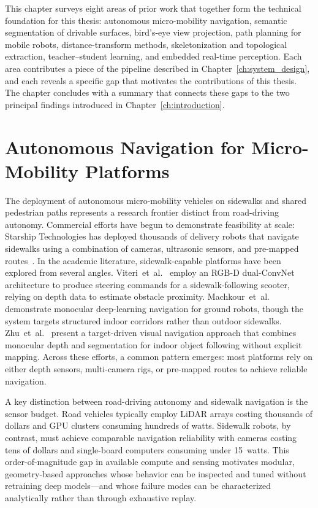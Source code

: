 \documentclass[12pt,letterpaper,oneside]{report}
\begin{document}
This chapter surveys eight areas of prior work that together form the technical foundation for this thesis: autonomous micro-mobility navigation, semantic segmentation of drivable surfaces, bird's-eye view projection, path planning for mobile robots, distance-transform methods, skeletonization and topological extraction, teacher--student learning, and embedded real-time perception. Each area contributes a piece of the pipeline described in Chapter~\ref{ch:system_design}, and each reveals a specific gap that motivates the contributions of this thesis. The chapter concludes with a summary that connects these gaps to the two principal findings introduced in Chapter~\ref{ch:introduction}.


\section{Autonomous Navigation for Micro-Mobility Platforms}

The deployment of autonomous micro-mobility vehicles on sidewalks and shared pedestrian paths represents a research frontier distinct from road-driving autonomy. Commercial efforts have begun to demonstrate feasibility at scale: Starship Technologies has deployed thousands of delivery robots that navigate sidewalks using a combination of cameras, ultrasonic sensors, and pre-mapped routes~\cite{starship2022}. In the academic literature, sidewalk-capable platforms have been explored from several angles. Viteri~et~al.~\cite{viteri2024} employ an RGB-D dual-ConvNet architecture to produce steering commands for a sidewalk-following scooter, relying on depth data to estimate obstacle proximity. Machkour~et~al.~\cite{machkour2023} demonstrate monocular deep-learning navigation for ground robots, though the system targets structured indoor corridors rather than outdoor sidewalks. Zhu~et~al.~\cite{zhu2017target} present a target-driven visual navigation approach that combines monocular depth and segmentation for indoor object following without explicit mapping. Across these efforts, a common pattern emerges: most platforms rely on either depth sensors, multi-camera rigs, or pre-mapped routes to achieve reliable navigation.

A key distinction between road-driving autonomy and sidewalk navigation is the sensor budget. Road vehicles typically employ LiDAR arrays costing thousands of dollars and GPU clusters consuming hundreds of watts. Sidewalk robots, by contrast, must achieve comparable navigation reliability with cameras costing tens of dollars and single-board computers consuming under 15~watts. This order-of-magnitude gap in available compute and sensing motivates modular, geometry-based approaches whose behavior can be inspected and tuned without retraining deep models---and whose failure modes can be characterized analytically rather than through exhaustive replay.
\end{document}
